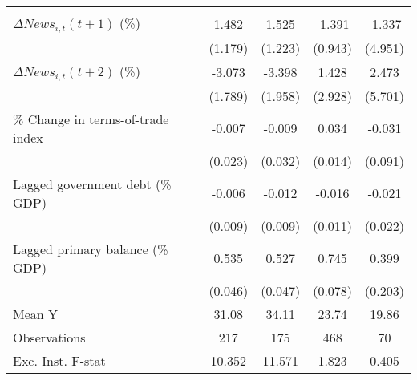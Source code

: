 {\begin{tabular}{l*{4}{c}}
                    &                     &                     &                     &                     \\
\addlinespace
$ \Delta News_{i,t}(t+1)$ (\%)&       1.482         &       1.525         &      -1.391         &      -1.337         \\
                    &     (1.179)         &     (1.223)         &     (0.943)         &     (4.951)         \\
\addlinespace
$ \Delta News_{i,t}(t+2)$ (\%)&      -3.073\sym{*}  &      -3.398\sym{*}  &       1.428         &       2.473         \\
                    &     (1.789)         &     (1.958)         &     (2.928)         &     (5.701)         \\
\addlinespace
\% Change in terms-of-trade index&      -0.007         &      -0.009         &       0.034\sym{**} &      -0.031         \\
                    &     (0.023)         &     (0.032)         &     (0.014)         &     (0.091)         \\
\addlinespace
Lagged government debt (\% GDP)&      -0.006         &      -0.012         &      -0.016         &      -0.021         \\
                    &     (0.009)         &     (0.009)         &     (0.011)         &     (0.022)         \\
\addlinespace
Lagged primary balance (\% GDP)&       0.535\sym{***}&       0.527\sym{***}&       0.745\sym{***}&       0.399\sym{**} \\
                    &     (0.046)         &     (0.047)         &     (0.078)         &     (0.203)         \\
\midrule
Mean Y              &       31.08         &       34.11         &       23.74         &       19.86         \\
Observations        &         217         &         175         &         468         &          70         \\
Exc. Inst. F-stat   &      10.352         &      11.571         &       1.823         &       0.405         \\
\bottomrule
\end{tabular}
}
